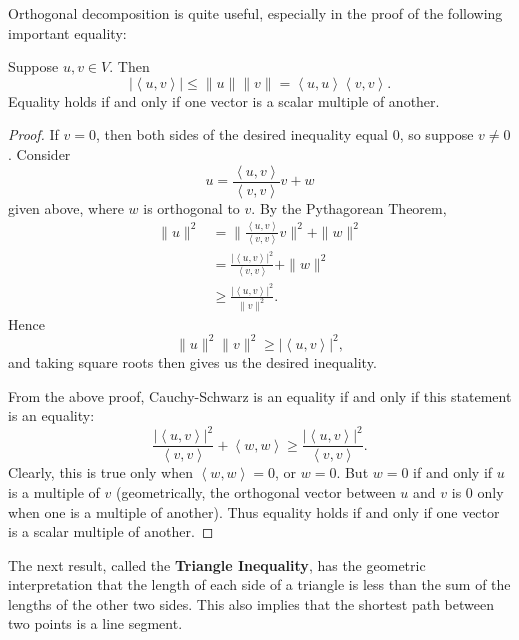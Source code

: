 \documentclass[math0540-lecture-notes.tex]{subfiles}
\begin{document}
Orthogonal decomposition is quite useful, especially in the proof of the following important
equality:
\begin{proposition}{}
  Suppose $u,v\in V$. Then \[
    \left| \left<u,v \right> \right|  \le \|u\|\|v\|=\left<u,u \right>\left<v,v \right>
  .\] Equality holds if and only if one vector is a scalar multiple of another.
\end{proposition}
\begin{proof}[Proof]
  If $v=0$, then both sides of the desired inequality equal $0$, so suppose $v\neq 0$. Consider \[
    u = \frac{\left<u,v \right>}{\left<v,v \right>}v+w
  \] given above, where $w$ is orthogonal to $v$. By the Pythagorean Theorem,
  \begin{align*}
    \|u\|^2&= \|\frac{\left<u,v \right>}{\left<v,v \right>}v\|^2+\|w\|^2 \\
           &= \frac{\left| \left<u,v \right> \right| ^2}{\left<v,v \right>}+\|w\|^2 \\
           &\ge \frac{\left| \left<u,v \right> \right| ^2}{\|v\|^2}
  .\end{align*} Hence \[
    \|u\|^2\|v\|^2 \ge \left| \left<u,v \right> \right| ^2
  ,\] and taking square roots then gives us the desired inequality.

  From the above proof, Cauchy-Schwarz is an equality if and only if this statement is an equality:
  \[
    \frac{\left| \left<u,v \right> \right| ^2}{\left<v,v \right>}+\left<w,w \right>\ge \frac{\left|
    \left<u,v \right> \right|^2 }{\left<v,v \right>}
  .\] Clearly, this is true only when $\left<w,w \right>=0$, or $w=0$. But $w=0$ if and only if $u$
  is a multiple of $v$ (geometrically, the orthogonal vector between $u$ and $v$ is $0$ only when
  one is a multiple of another). Thus equality holds if and only if one vector is a scalar multiple
  of another.
\end{proof}

The next result, called the \textbf{Triangle Inequality}, has the geometric interpretation that the
length of each side of a triangle is less than the sum of the lengths of the other two sides. This
also implies that the shortest path between two points is a line segment.
\end{document}
